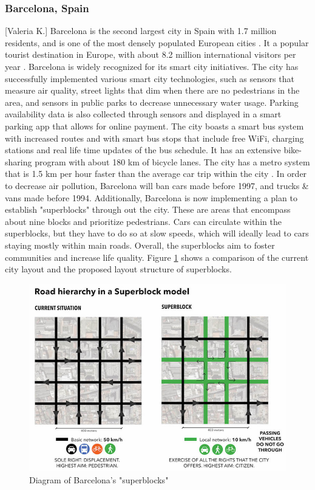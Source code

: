 \documentclass[12pt]{article}                               %
\begin{document}
\subsubsection{Barcelona, Spain}[Valeria K.]
Barcelona is the second largest city in Spain with 1.7 million residents, and is one of the most densely populated European cities \cite{Bausells2016SuperblocksResidents}. It a popular tourist destination in Europe, with about 8.2 million international visitors per year \cite{Bausells2016SuperblocksResidents}. Barcelona is widely recognized for its smart city initiatives. The city has successfully implemented various smart city technologies, such as sensors that measure air quality, street lights that dim when there are no pedestrians in the area, and sensors in public parks to decrease unnecessary water usage. Parking availability data is also collected through sensors and displayed in a smart parking app that allows for online payment. The city boasts a smart bus system with increased routes and with smart bus stops that include free WiFi, charging stations and real life time updates of the bus schedule. It has an extensive bike-sharing program with about 180 km of bicycle lanes. The city has a metro system that is 1.5 km per hour faster than the average car trip within the city \cite{Bausells2016SuperblocksResidents}. In order to decrease air pollution, Barcelona will ban cars made before 1997, and trucks \& vans made before 1994. Additionally, Barcelona is now implementing a plan to establish "superblocks" through out the city. These are areas that encompass about nine blocks and prioritize pedestrians. Cars can circulate within the superblocks, but they have to do so at slow speeds, which will ideally lead to cars staying mostly within main roads. Overall, the superblocks aim to foster communities and increase life quality. Figure \ref{img:barcelona_superblock} shows a comparison of the current city layout and the proposed layout structure of superblocks.

\begin{figure}[H]
    \centering
    \includegraphics[width=0.85\columnwidth]{images/barcelona_superblock.jpg}
    \caption{Diagram of Barcelona's "superblocks"}
    \label{img:barcelona_superblock}
\end{figure}
\end{document}
